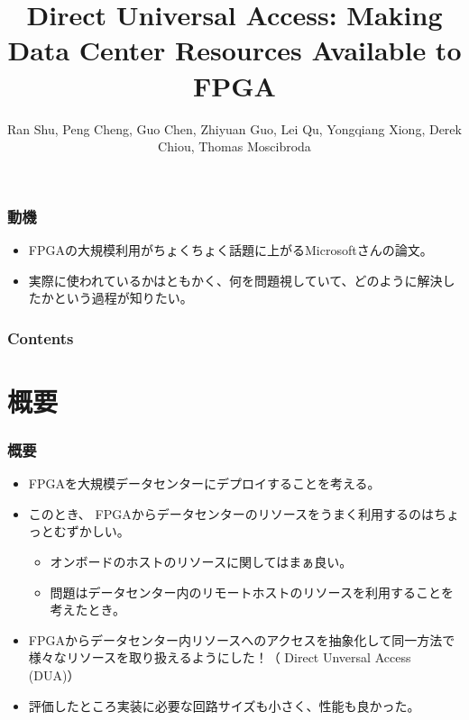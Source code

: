 \documentclass[dvipdfmx,9pt,notheorems]{beamer}
\title{Direct Universal Access: Making Data Center Resources Available to FPGA}
\author{Ran Shu\footnotemark[1], Peng Cheng\footnotemark[1], Guo Chen\footnotemark[1,2], Zhiyuan Guo\footnotemark[1,3], Lei Qu\footnotemark[1], Yongqiang Xiong\footnotemark[1], Derek Chiou\footnotemark[4], Thomas Moscibroda\footnotemark[4]}
\institute{\footnotemark[1]Microsoft Research, \footnotemark[2]Hunan University, \footnotemark[3]Beihang University, \footnotemark[4]Microsoft Azure}
\theoremstyle{definition}
\begin{document}
\begin{frame}[plain]\frametitle{}
\titlepage %
\end{frame}

\begin{frame}\frametitle{動機}
	\begin{itemize}
		\item FPGAの大規模利用がちょくちょく話題に上がるMicrosoftさんの論文。
		\item 実際に使われているかはともかく、何を問題視していて、どのように解決したかという過程が知りたい。
	\end{itemize}
\end{frame}

\begin{frame}\frametitle{Contents}
\raggedright
\tableofcontents
\end{frame}

\section{概要}
\begin{frame}\frametitle{概要}
\begin{itemize}
	\item FPGAを大規模データセンターにデプロイすることを考える。
	\item このとき、{\color{red} FPGAからデータセンターのリソースをうまく利用する}のはちょっとむずかしい。
  	\begin{itemize}
			\item オンボードのホストのリソースに関してはまぁ良い。
  		\item	問題はデータセンター内のリモートホストのリソースを利用することを考えたとき。
  	\end{itemize}
	\item FPGAからデータセンター内リソースへのアクセスを抽象化して同一方法で様々なリソースを取り扱えるようにした！（{\color{red} Direct Unversal Access} (DUA)）
	\item 評価したところ実装に必要な回路サイズも小さく、性能も良かった。
\end{itemize}
\end{frame}


\end{document}
